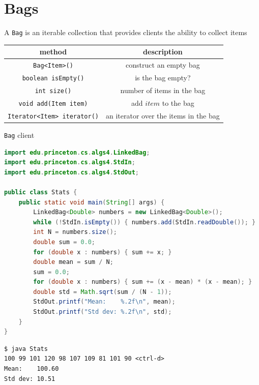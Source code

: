 \documentclass[8pt,a4paper,compress]{beamer}
\begin{document}
\section{Bags}
\begin{frame}[fragile]
\pause

A \lstinline{Bag} is an iterable collection that provides clients the ability to collect items
\begin{center}
\begin{tabular}{cc}
method & description \\ \hline
\lstinline$Bag<Item>()$ & construct an empty bag \\
\lstinline$boolean isEmpty()$ & is the bag empty? \\
\lstinline$int size()$ & number of items in the bag \\
\lstinline$void add(Item item)$ & add $item$ to the bag \\
\lstinline$Iterator<Item> iterator()$ & an iterator over the items in the bag
\end{tabular} 
\end{center}

\pause

\lstinline{Bag} client
\begin{lstlisting}[language=Java]
import edu.princeton.cs.algs4.LinkedBag;
import edu.princeton.cs.algs4.StdIn;
import edu.princeton.cs.algs4.StdOut;

public class Stats {
    public static void main(String[] args) {
        LinkedBag<Double> numbers = new LinkedBag<Double>();
        while (!StdIn.isEmpty()) { numbers.add(StdIn.readDouble()); }
        int N = numbers.size();
        double sum = 0.0;
        for (double x : numbers) { sum += x; }
        double mean = sum / N;
        sum = 0.0;
        for (double x : numbers) { sum += (x - mean) * (x - mean); }
        double std = Math.sqrt(sum / (N - 1));
        StdOut.printf("Mean:    %.2f\n", mean);
        StdOut.printf("Std dev: %.2f\n", std);
    }
}
\end{lstlisting}

\pause

\begin{lstlisting}[language={}]
$ java Stats
100 99 101 120 98 107 109 81 101 90 <ctrl-d>
Mean:    100.60
Std dev: 10.51
\end{lstlisting}
\end{frame}
\end{document}
